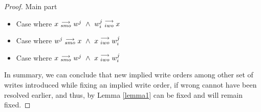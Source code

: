 \begin{proof}{Main part}
\begin{itemize}
\begin{itemize}

                            \item Case where $x\stackrel{\longrightarrow}{_{smo}}w^j \ \wedge \ w_i^j\stackrel{\longrightarrow}{_{iwo}}x$

                            \item Case where $w^j\stackrel{\longrightarrow}{_{smo}}x \ \wedge \ x\stackrel{\longrightarrow}{_{iwo}}w_i^j$

                            \item Case where $x\stackrel{\longrightarrow}{_{smo}}w^j \ \wedge \ x\stackrel{\longrightarrow}{_{iwo}}w_i^j$

                        \end{itemize}
                \end{itemize}

                In summary, we can conclude that new implied write orders among other set of writes introduced while fixing an implied write order, if wrong cannot have been resolved earlier, and thus, by Lemma \ref{lemma1} can be fixed and will remain fixed.

        \end{proof}

